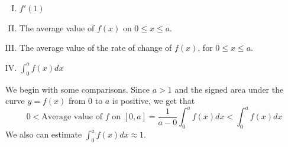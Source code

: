 \documentclass[11pt]{exam}
\begin{document}
\begin{questions}
\begin{minipage}{0.5\linewidth}
    \end{minipage}
    \begin{minipage}{0.5\linewidth}
      \begin{enumerate}[(I)]
      \item \(f'(1)\)
      \item The average value of \(f(x)\) on \(0 \leq x \leq a\).
      \item The average value of the rate of change of \(f(x)\), for
        \(0 \leq x \leq a\).
      \item \(\int_0^a f(x) dx\)
      \end{enumerate}
    \end{minipage}
    \begin{solution}
      We begin with some comparisons. Since \(a > 1\) and the signed
      area under the curve \(y=f(x)\) from \(0\) to \(a\) is positive, we get that \[
        0 < \text{Average value of }f\text{ on }[0,a] = \frac{1}{a-0}
       \int_0^a f(x) dx < \int_0^a f(x) dx
      \]
      We also can estimate \(\int_0^a f(x) dx \approx 1\).


\end{solution}
\end{questions}
\end{document}
